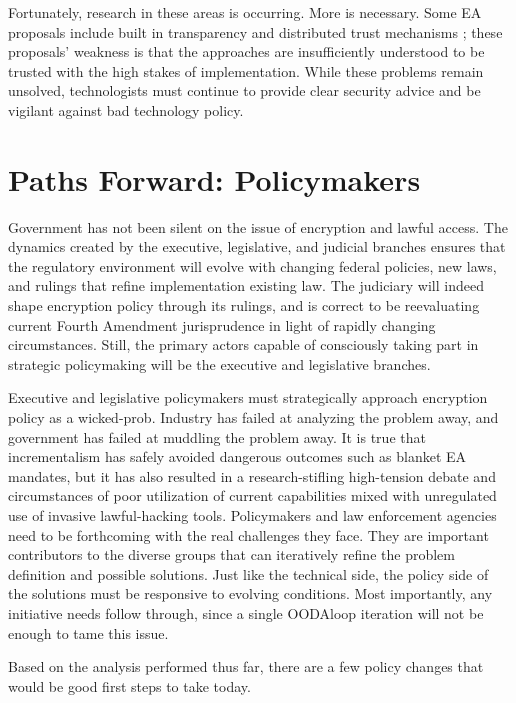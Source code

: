 Fortunately, research in these areas is occurring. More is necessary. Some \ac{EA} proposals include built in
transparency and distributed trust mechanisms \cite{goos_oblivious_1996} \cite{phan_key_2017}
\cite{servan_schreiber_jje_2020}; these proposals' weakness is that the approaches are insufficiently understood to be
trusted with the high stakes of implementation. While these problems remain unsolved, technologists must continue to
provide clear security advice and be vigilant against bad technology policy.


\section{Paths Forward: Policymakers}

Government has not been silent on the issue of encryption and lawful access. The dynamics created by the executive,
legislative, and judicial branches ensures that the regulatory environment will evolve with changing federal policies,
new laws, and rulings that refine implementation existing law. The judiciary will indeed shape encryption policy through
its rulings, and is correct to be reevaluating current Fourth Amendment jurisprudence in light of rapidly changing
circumstances. Still, the primary actors capable of consciously taking part in strategic policymaking will be the
executive and legislative branches.

Executive and legislative policymakers must strategically approach encryption policy as a \ac{wicked-prob}. Industry has
failed at analyzing the problem away, and government has failed at muddling the problem away. It is true that
incrementalism has safely avoided dangerous outcomes such as blanket \ac{EA} mandates, but it has also resulted in a
research-stifling high-tension debate and circumstances of poor utilization of current capabilities mixed with
unregulated use of invasive \ac{lawful-hacking} tools. Policymakers and law enforcement agencies need to be forthcoming
with the real challenges they face. They are important contributors to the diverse groups that can iteratively refine
the problem definition and possible solutions. Just like the technical side, the policy side of the solutions must be
responsive to evolving conditions. Most importantly, any initiative needs follow through, since a single \ac{OODAloop}
iteration will not be enough to tame this issue.

Based on the analysis performed thus far, there are a few policy changes that would be good first steps to take today.


